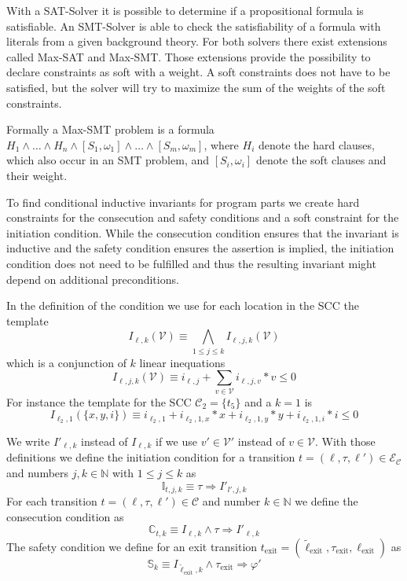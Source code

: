 With a SAT-Solver it is possible to determine if a propositional formula is satisfiable.
An SMT-Solver is able to check the satisfiability of a formula with literals from a given background theory.
For both solvers there exist extensions called Max-SAT and Max-SMT.
Those extensions provide the possibility to declare constraints as soft with a weight.
A soft constraints does not have to be satisfied, but the solver will try to maximize the sum of the weights of the soft constraints.

Formally a Max-SMT problem is a formula $H_1 \wedge \dots \wedge H_n \wedge [S_1,\omega_1] \wedge \dots \wedge [S_m,\omega_m]$, where $H_i$ denote the hard clauses, which also occur in an SMT problem, and $[S_i,\omega_i]$ denote the soft clauses and their weight.

To find conditional inductive invariants for program parts we create hard constraints for the consecution and safety conditions and a soft constraint for the initiation condition.
While the consecution condition ensures that the invariant is inductive and the safety condition ensures the assertion is implied, the initiation condition does not need to be fulfilled and thus the resulting invariant might depend on additional preconditions.  

In the definition of the condition we use for each location in the SCC the template \[ I_{\ell,k}(\mathcal{V}) \equiv \bigwedge_{1 \leq j \leq k}{I_{\ell,j,k}(\mathcal{V})} \] which is a conjunction of $k$ linear inequations \[ I_{\ell,j,k}(\mathcal{V}) \equiv i_{\ell,j} + \sum_{v \in \mathcal{V}}{i_{\ell,j,v} * v} \leq 0 \]
For instance the template for the SCC $\mathcal{C}_2 = \lbrace t_5 \rbrace$ and a $k=1$ is \[ I_{\ell_2,1}(\lbrace x, y, i \rbrace) \equiv i_{\ell_2,1} + i_{\ell_2,1,x} * x + i_{\ell_2,1,y} * y + i_{\ell_2,1,i} * i \leq 0 \]

We write $I'_{\ell,k}$ instead of $I_{\ell,k}$ if we use $v' \in \mathcal{V}'$ instead of $v \in \mathcal{V}$.
With those definitions we define the initiation condition for a transition $t = (\ell, \tau, \ell') \in \mathcal{E}_\mathcal{C}$ and numbers $j, k \in \mathbb{N}$ with $1 \leq j \leq k$ as \[ \mathbb{I}_{t,j,k} \equiv \tau \Rightarrow I'_{l',j,k} \]
For each transition $t = (\ell, \tau, \ell') \in \mathcal{C}$ and number $k \in \mathbb{N}$ we define the consecution condition as \[ \mathbb{C}_{t,k} \equiv I_{\ell,k} \wedge \tau \Rightarrow I'_{\ell,k} \]
The safety condition we define for an exit transition $t_\text{exit} = (\tilde{\ell}_\text{exit}, \tau_\text{exit}, \ell_\text{exit})$ as \[ \mathbb{S}_k \equiv I_{\tilde{\ell}_\text{exit},k} \wedge \tau_\text{exit} \Rightarrow \varphi' \]

